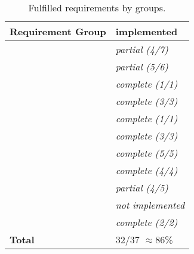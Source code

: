 \begin{table}[H]
    \begin{tabu}{X l}
        \toprule
        Requirement Group
        & implemented\\
        \midrule

        & \textit{partial (4/7)} \\

        & \textit{partial (5/6)}\\

        & \textit{complete (1/1)}\\

        & \textit{complete (3/3)}\\

        & \textit{complete (1/1)}\\

        & \textit{complete (3/3)}\\

        & \textit{complete (5/5)}\\

        & \textit{complete (4/4)}\\

        & \textit{partial (4/5)}\\

        & \textit{not implemented}\\

        & \textit{complete (2/2)}\\

        \textbf{Total}
        & 32/37 $\approx 86\%$ \\

    \end{tabu}
    \caption{Fulfilled requirements by groups.}
    \label{tab:implemented-requirements}
\end{table}


